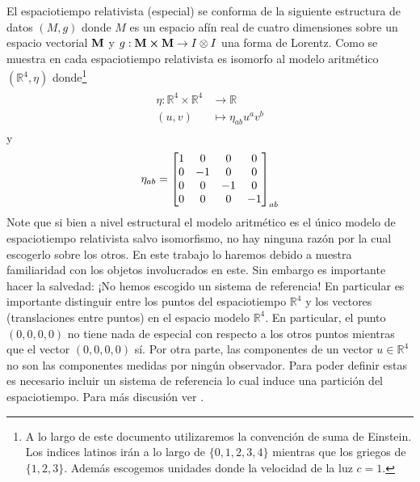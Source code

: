 \documentclass[11pt]{article}
\begin{document}
El espaciotiempo relativista (especial) se conforma de la siguiente estructura de datos $(M,g)$ donde $M$ es un espacio afín real de cuatro dimensiones sobre un espacio vectorial $\vb{M}$ y $g:\vb{M}\cross\vb{M}\rightarrow I\otimes I$ una forma de Lorentz. Como se muestra en \cite{Matolcsi1993} cada espaciotiempo relativista es isomorfo al modelo aritmético $(\mathbb{R}^4,\eta)$ donde\footnote{A lo largo de este documento utilizaremos la convención de suma de Einstein. Los indices latinos irán a lo largo de $\{0,1,2,3,4\}$ mientras que los griegos de $\{1,2,3\}$. Además escogemos unidades donde la velocidad de la luz $c=1$.}
\begin{align}
\begin{split}
\eta:\mathbb{R}^4\times\mathbb{R}^4&\rightarrow\mathbb{R} \\
(u,v)&\mapsto \eta_{ab}u^a v^b
\end{split}
\end{align}  
y 
\begin{equation}
\eta_{ab}=\mqty[1 & 0 & 0 & 0 \\ 0 & -1 & 0 & 0 \\ 0 & 0 & -1 & 0 \\ 0 & 0 & 0 & -1]_{ab}
\end{equation}
Note que si bien a nivel estructural el modelo aritmético es el único modelo de espaciotiempo relativista salvo isomorfismo, no hay ninguna razón por la cual escogerlo sobre los otros. En este trabajo lo haremos debido a nuestra familiaridad con los objetos involucrados en este. Sin embargo es importante hacer la salvedad: ¡No hemos escogido un sistema de referencia! En particular es importante distinguir entre los puntos del espaciotiempo $\mathbb{R}^4$ y los vectores (translaciones entre puntos) en el espacio modelo $\mathbb{R}^4$. En particular, el punto $(0,0,0,0)$ no tiene nada de especial con respecto a los otros puntos mientras que el vector $(0,0,0,0)$ sí. Por otra parte, las componentes de un vector $u\in\mathbb{R}^4$ no son las componentes medidas por ningún observador. Para poder definir estas es necesario incluir un sistema de referencia lo cual induce una partición del espaciotiempo. Para más discusión ver \cite{Matolcsi1993}.
\end{document}
